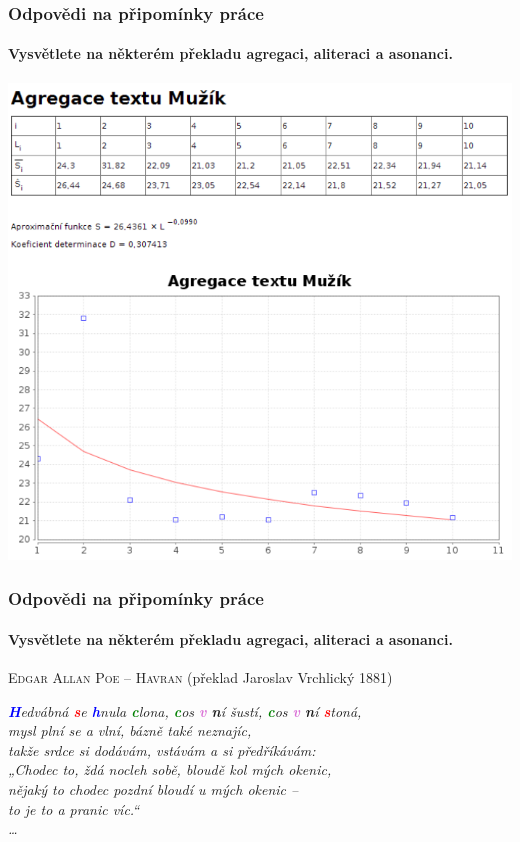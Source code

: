 \documentclass[12pt,xcolor=usenames,dvipsnames]{beamer}
\begin{document}
\begin{frame}
	\frametitle{Odpovědi na připomínky práce}
	\framesubtitle{Vysvětlete na některém překladu \textbf{agregaci}, aliteraci a asonanci.}
	\vspace{-8pt}
	\begin{center}
		\includegraphics[width=\linewidth,height=0.8\textheight,keepaspectratio]{agregace}
	\end{center}

\end{frame}

\begin{frame}
	\frametitle{Odpovědi na připomínky práce}
	\framesubtitle{Vysvětlete na některém překladu agregaci, \textbf{aliteraci} a asonanci.}

	\begin{center}
	
		\textsc{Edgar Allan Poe -- Havran} {\tiny (překlad Jaroslav Vrchlický 1881)}
	
		\emph{\textbf{\textcolor{blue}{H}}edvábná \textbf{\textcolor{Red}{s}}e \textbf{\textcolor{blue}{h}}nula \textbf{\textcolor{Green}{c}}lona, \textbf{\textcolor{Green}{c}}os \textbf{\textcolor{Orchid}{v}} \textbf{\textcolor{BurntOrange}{n}}í šustí, \textbf{\textcolor{Green}{c}}os \textbf{\textcolor{Orchid}{v}} \textbf{\textcolor{BurntOrange}{n}}í \textbf{\textcolor{Red}{s}}toná,\\
mysl plní se a vlní, bázně také neznajíc,\\
takže srdce si dodávám, vstávám a si předříkávám:\\
„Chodec to, ždá nocleh sobě, bloudě kol mých okenic,\\
nějaký to chodec pozdní bloudí u mých okenic --\\
        to je to a pranic víc.“\\\dots}

	\end{center}
\end{frame}
\end{document}

